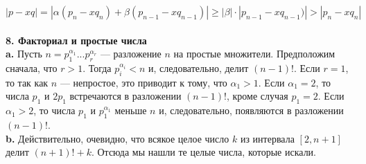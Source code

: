$$|p-xq|=|\alpha(p_n-xq_n)+\beta(p_{n-1}-xq_{n-1})|\geqslant|\beta|\cdot|p_{n-1}-xq_{n-1})|>|p_n-xq_n|$$
\\
\noindent\textbf{8. Факториал и простые числа} \newline 
\\
\hspace*{15pt}\textbf{a.} Пусть $n=p_1^{\alpha_1}...p_r^{\alpha_r}$  — разложение $n$ на простые множители. \linebreak
Предположим сначала, что $r>1$. Тогда $p_i^{\alpha_i}<n$ и, следовательно, делит\linebreak
$(n-1)!$. Если $r=1$, то так как $n$ — непростое, это приводит к тому,\linebreak
что $\alpha_1>1$. Если $\alpha_1=2$, то числа $p_1$ и $2p_1$ встречаются в разложении\linebreak
$(n-1)!$, кроме случая $p_1=2$. Если $\alpha_1>2$, то числа $p_1$ и $p_1^{\alpha_1}$ меньше $n$\linebreak
и, следовательно, появляются в разложении $(n-1)!$.\newline
\\
\hspace*{15pt}\textbf{b.} Действительно, очевидно, что всякое целое число $k$ из интервала\linebreak
$[2, n+1]$ делит $(n+1)!+k$. Отсюда мы нашли те целые числа, которые\linebreak
искали.\newpage

